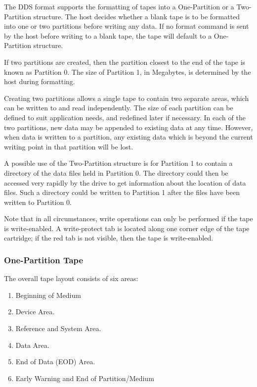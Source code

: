 The DDS format supports the formatting of tapes into a One-Partition or a
Two-Partition structure. The host decides whether a blank tape is to be
formatted into one or two partitions before writing any data. If no format
command is sent by the host before writing to a blank tape, the tape will
default to a One-Partition structure.

If two partitions are created, then the partition closest to the end of the
tape is known as Partition 0. The size of Partition 1, in Megabytes, is
determined by the host during formatting.

Creating two partitions allows a single tape to contain two separate areas,
which can be written to and read independently. The size of each partition
can be defined to suit application needs, and redefined later if necessary.
In each of the two partitions, new data may be appended to existing data at
any time. However, when data is written to a partition, any existing data
which is beyond the current writing point in that partition will be lost.

A possible use of the Two-Partition structure is for Partition 1 to contain
a directory of the data files held in Partition 0. The directory could then
be accessed very rapidly by the drive to get information about the location
of data files. Such a directory could be written to Partition 1 after the
files have been written to Partition 0.

Note that in all circumstances, write operations can only be performed if
the tape is write-enabled. A write-protect tab is located along one corner
edge of the tape cartridge; if the red tab is not visible, then the tape is
write-enabled.

\subsubsection {One-Partition Tape}

The overall tape layout consists of six areas:

\begin {enumerate}

\item Beginning of Medium

\item Device Area.

\item Reference and System Area.

\item Data Area.

\item End of Data (EOD) Area.

\item Early Warning and End of Partition/Medium

\end {enumerate}

